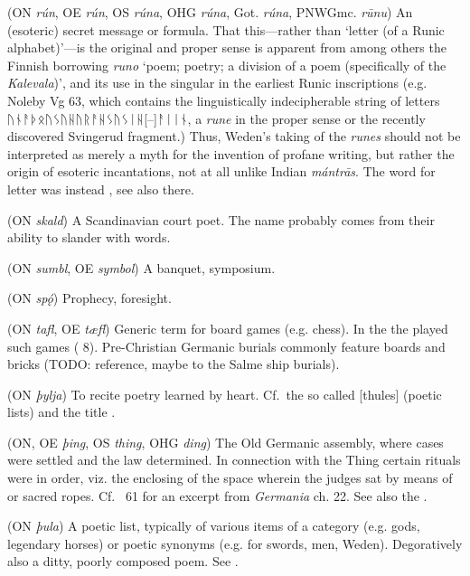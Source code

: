 \begin{itemize}
 (ON \emph{rún}, OE \emph{rún}, OS \emph{rúna}, OHG \emph{rúna}, Got. \emph{rúna}, PNWGmc. \emph{rūnu})
  An (esoteric) secret message or formula. That this---rather than ‘letter (of a Runic alphabet)’---is the original and proper sense is apparent from among others the Finnish borrowing \emph{runo} ‘poem; poetry; a division of a poem (specifically of the \emph{Kalevala})’, and its use in the singular in the earliest Runic inscriptions (e.g. Noleby Vg 63, which contains the linguistically indecipherable string of letters {ᚢᚾᚨᚦᛟᚢᛊᚢᚺᚢᚱᚨᚺᛊᚢᛊᛁᚺ[--]ᚨᛁᛁᚾ}, a \emph{rune} in the proper sense or the recently discovered Svingerud fragment.) Thus, Weden’s taking of the \emph{runes} should not be interpreted as merely a myth for the invention of profane writing, but rather the origin of esoteric incantations, not at all unlike Indian \emph{mántrās}.
  The word for letter was instead , see also there.


 (ON \emph{skald})
  A Scandinavian court poet.  The name probably comes from their ability to slander with words.

 (ON \emph{sumbl}, OE \emph{symbol})
  A banquet, symposium.

 (ON \emph{spǫ́})
  Prophecy, foresight.

 (ON \emph{tafl}, OE \emph{tæfl})
  Generic term for board games (e.g. chess).  In the  the  played such games ( 8).  Pre-Christian Germanic burials commonly feature boards and bricks (TODO: reference, maybe to the Salme ship burials).

 (ON \emph{þylja})
  To recite poetry learned by heart.  Cf.~the so called [thules] (poetic lists) and the title .

 (ON, OE \emph{þing}, OS \emph{thing}, OHG \emph{ding})
  The Old Germanic assembly, where cases were settled and the law determined.  In connection with the Thing certain rituals were in order, viz. the enclosing of the space wherein the judges sat by means of  or sacred ropes.  Cf.~ 61 for an excerpt from \emph{Germania} ch. 22.  See also the .

 (ON \emph{þula})
  A poetic list, typically of various items of a category (e.g. gods, legendary horses) or poetic synonyms (e.g. for swords, men, Weden). Degoratively also a ditty, poorly composed poem. See .


\end{itemize}
